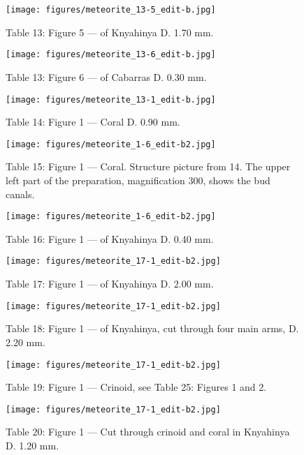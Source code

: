 \documentclass[a4paper, 12pt, oneside]{article}
\begin{document}
\clearpage
\begin{figure}[t]
\texttt{[image: figures/meteorite\_13-5\_edit-b.jpg]}
\caption{Table 13: Figure 5 --- of Knyahinya D. 1.70 mm.}
\centering
\end{figure}
\clearpage
\begin{figure}[t]
\texttt{[image: figures/meteorite\_13-6\_edit-b.jpg]}
\caption{Table 13: Figure 6 --- of Cabarras D. 0.30 mm.}
\centering
\end{figure}
\clearpage
\begin{figure}[t]
\texttt{[image: figures/meteorite\_13-1\_edit-b.jpg]}
\caption{Table 14: Figure 1 --- Coral D. 0.90 mm.}
\centering
\end{figure}
\clearpage
\begin{figure}[t]
\texttt{[image: figures/meteorite\_1-6\_edit-b2.jpg]}
\caption{Table 15: Figure 1 --- Coral. Structure picture from 14. The upper left part of the preparation, magnification 300, shows the bud canals.}
\centering
\end{figure}
\clearpage
{}
\begin{figure}[t]
\texttt{[image: figures/meteorite\_1-6\_edit-b2.jpg]}
\caption{Table 16: Figure 1 --- of Knyahinya D. 0.40 mm.}
\centering
\end{figure}
\clearpage
\begin{figure}[t]
\texttt{[image: figures/meteorite\_17-1\_edit-b2.jpg]}
\caption{Table 17: Figure 1 --- of Knyahinya D. 2.00 mm.}
\centering
\end{figure}
\clearpage
\begin{figure}[t]
\texttt{[image: figures/meteorite\_17-1\_edit-b2.jpg]}
\caption{Table 18: Figure 1 --- of Knyahinya, cut through four main arms, D. 2.20 mm.}
\centering
\end{figure}
\clearpage
\begin{figure}[t]
\texttt{[image: figures/meteorite\_17-1\_edit-b2.jpg]}
\caption{Table 19: Figure 1 --- Crinoid, see Table 25: Figures 1 and 2.}
\centering
\end{figure}
\clearpage
\begin{figure}[t]
\texttt{[image: figures/meteorite\_17-1\_edit-b2.jpg]}
\caption{Table 20: Figure 1 --- Cut through crinoid and coral in Knyahinya D. 1.20 mm.}
\centering
\end{figure}
\end{document}
